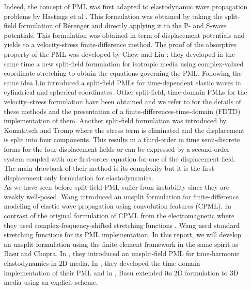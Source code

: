 Indeed, the concept of PML was first adapted to elastodynamic wave propagation problems by Hastings et al \cite{Hastings}. This formulation was obtained by taking the split-field formulation of Bérenger and directly applying it to the P- and S-wave potentials. This formulation was obtained in term of displacement potentials and yields to a velocity-stress finite-difference method. The proof of the absorptive property of the PML was developed by Chew and Liu \cite{ChewLiu}: they developed in the same time a new split-field formulation for isotropic media using complex-valued coordinate stretching to obtain the equations governing the PML. Following the same idea Liu \cite{Liu} introduced a split-field PMLs for time-dependent elastic waves in cylindrical and spherical coordinates. Other split-field, time-domain PMLs for the velocity–stress formulation have been obtained and we refer to \cite{Zhang,Collino,Becache2} for the details of these methods and the presentation of a finite-differences-time-domain (FDTD) implementation of them. Another split-field formulation was introduced by Komatitsch and Tromp \cite{Komatitsch} where the stress term is eliminated and the displacement is split into four components. This results in a third-order in time semi-discrete forms for the four displacement fields or can be expressed by a second-order system coupled with one first-order equation for one of the displacement field. The main drawback of their method is its complexity but it is the first displacement only formulation for elastodynamics.\\
As we have seen before split-field PML suffer from instability since they are weakly well-posed. Wang \cite{Wang} introduced an unsplit formulation for finite-difference modeling of elastic wave propagation using convolution features (CPML). In contrast of the original formulation of CPML from the electromagnetic where they used complex-frequency-shifted stretching functions \cite{Teixeira, Roden}, Wang used standard stretching functions for its PML implementation.  In this report, we will develop an unsplit formulation using the finite element framework in the same spirit as Basu and Chopra. In \cite{Basu2003}, they introduced an unsplit-field PML for time-harmonic elastodynamics in 2D media. In \cite{Basu2004}, they developed the time-domain implementation of their PML and in \cite{Basu2008}, Basu extended its 2D formulation to 3D media using an explicit scheme. \\ 
